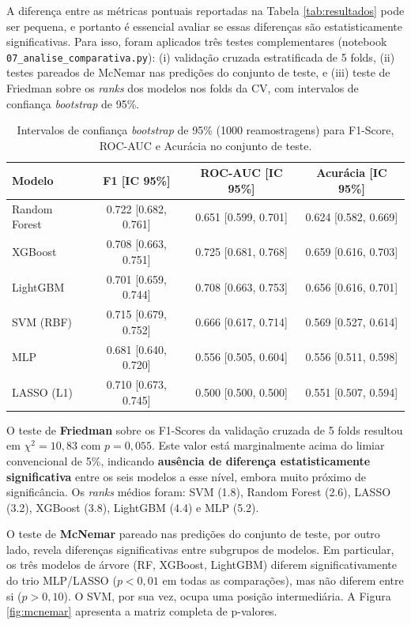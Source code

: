 \documentclass[12pt, a4paper, oneside]{report}
\begin{document}
A diferença entre as métricas pontuais reportadas na Tabela \ref{tab:resultados} pode ser pequena, e portanto é essencial avaliar se essas diferenças são estatisticamente significativas. Para isso, foram aplicados três testes complementares (notebook \texttt{07\_analise\_comparativa.py}): (i) validação cruzada estratificada de 5 folds, (ii) testes pareados de McNemar nas predições do conjunto de teste, e (iii) teste de Friedman sobre os \textit{ranks} dos modelos nos folds da CV, com intervalos de confiança \textit{bootstrap} de 95\%.

\begin{table}[H]
    \centering
    \caption{Intervalos de confiança \textit{bootstrap} de 95\% (1000 reamostragens) para F1-Score, ROC-AUC e Acurácia no conjunto de teste.}
    \label{tab:bootstrap}
    \begin{tabular}{lccc}
        \toprule
        \textbf{Modelo} & \textbf{F1 [IC 95\%]} & \textbf{ROC-AUC [IC 95\%]} & \textbf{Acurácia [IC 95\%]} \\
        \midrule
        Random Forest & 0.722 [0.682, 0.761] & 0.651 [0.599, 0.701] & 0.624 [0.582, 0.669] \\
        XGBoost       & 0.708 [0.663, 0.751] & 0.725 [0.681, 0.768] & 0.659 [0.616, 0.703] \\
        LightGBM      & 0.701 [0.659, 0.744] & 0.708 [0.663, 0.753] & 0.656 [0.616, 0.701] \\
        SVM (RBF)     & 0.715 [0.679, 0.752] & 0.666 [0.617, 0.714] & 0.569 [0.527, 0.614] \\
        MLP           & 0.681 [0.640, 0.720] & 0.556 [0.505, 0.604] & 0.556 [0.511, 0.598] \\
        LASSO (L1)    & 0.710 [0.673, 0.745] & 0.500 [0.500, 0.500] & 0.551 [0.507, 0.594] \\
        \bottomrule
    \end{tabular}
\end{table}

O teste de \textbf{Friedman} sobre os F1-Scores da validação cruzada de 5 folds resultou em $\chi^2 = 10{,}83$ com $p = 0{,}055$. Este valor está marginalmente acima do limiar convencional de 5\%, indicando \textbf{ausência de diferença estatisticamente significativa} entre os seis modelos a esse nível, embora muito próximo de significância. Os \textit{ranks} médios foram: SVM (1.8), Random Forest (2.6), LASSO (3.2), XGBoost (3.8), LightGBM (4.4) e MLP (5.2).

O teste de \textbf{McNemar} pareado nas predições do conjunto de teste, por outro lado, revela diferenças significativas entre subgrupos de modelos. Em particular, os três modelos de árvore (RF, XGBoost, LightGBM) diferem significativamente do trio MLP/LASSO ($p < 0{,}01$ em todas as comparações), mas não diferem entre si ($p > 0{,}10$). O SVM, por sua vez, ocupa uma posição intermediária. A Figura \ref{fig:mcnemar} apresenta a matriz completa de p-valores.
\end{document}
